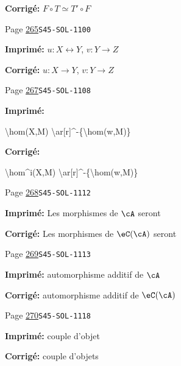 \begin{description}
\par\noindent\textbf{Corrigé:} \(F\circ T \simeq T'\circ F\)
\smallskip
\item[\hypertarget{apparatus:FR-0275}{275}] Page \hyperlink{printpage:fr:265}{265}\quad\texttt{S45-SOL-1100}
\par\noindent\textbf{Imprimé:} $u:X\leftrightarrow Y$, $v:Y\to Z$
\par\noindent\textbf{Corrigé:} $u:X\to Y$, $v:Y\to Z$
\smallskip
\item[\hypertarget{apparatus:FR-0276}{276}] Page \hyperlink{printpage:fr:267}{267}\quad\texttt{S45-SOL-1108}
\par\noindent\textbf{Imprimé:} {\footnotesize\ttfamily\raggedright \textbackslash{}\allowbreak{}hom(\allowbreak{}X,\allowbreak{}M)\allowbreak{} \textbackslash{}\allowbreak{}ar[\allowbreak{}r]\allowbreak{}\textasciicircum{}\allowbreak{}-\allowbreak{}\{\allowbreak{}\textbackslash{}\allowbreak{}hom(\allowbreak{}w,\allowbreak{}M)\allowbreak{}\}\allowbreak{}\par}
\par\noindent\textbf{Corrigé:} {\footnotesize\ttfamily\raggedright \textbackslash{}\allowbreak{}hom\textasciicircum{}\allowbreak{}i(\allowbreak{}X,\allowbreak{}M)\allowbreak{} \textbackslash{}\allowbreak{}ar[\allowbreak{}r]\allowbreak{}\textasciicircum{}\allowbreak{}-\allowbreak{}\{\allowbreak{}\textbackslash{}\allowbreak{}hom(\allowbreak{}w,\allowbreak{}M)\allowbreak{}\}\allowbreak{}\par}
\smallskip
\item[\hypertarget{apparatus:FR-0277}{277}] Page \hyperlink{printpage:fr:268}{268}\quad\texttt{S45-SOL-1112}
\par\noindent\textbf{Imprimé:} Les morphismes de $\cA$ seront
\par\noindent\textbf{Corrigé:} Les morphismes de $\eC(\cA)$ seront
\smallskip
\item[\hypertarget{apparatus:FR-0278}{278}] Page \hyperlink{printpage:fr:269}{269}\quad\texttt{S45-SOL-1113}
\par\noindent\textbf{Imprimé:} automorphisme additif de $\cA$
\par\noindent\textbf{Corrigé:} automorphisme additif de $\eC(\cA)$
\smallskip
\item[\hypertarget{apparatus:FR-0279}{279}] Page \hyperlink{printpage:fr:270}{270}\quad\texttt{S45-SOL-1118}
\par\noindent\textbf{Imprimé:} couple d'objet
\par\noindent\textbf{Corrigé:} couple d'objets

\end{description}
